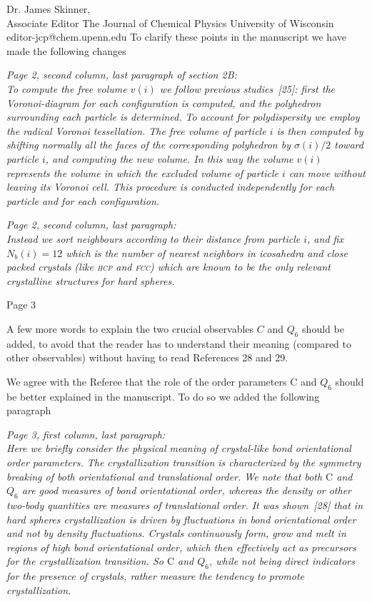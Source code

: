 \documentclass[a4paper, rebuttal, parskip=true, firsthead=false, fromemail=false, foldmarks=false]{scrlttr2}
\begin{document}
\begin{letter}{Dr. James Skinner,\\Associate Editor
The Journal of Chemical Physics
University of Wisconsin\\
editor-jcp@chem.upenn.edu }
To clarify these points in the manuscript we have made the following changes

{\it Page 2, second column, last paragraph of section 2B:\\
To compute the free volume $v(i)$ we follow previous
studies~[25]: first the Voronoi-diagram for each configuration is computed, and the polyhedron
surrounding each particle is determined. To account for polydispersity we employ the radical Voronoi tessellation.
The free volume of particle $i$ is then
computed by shifting normally all the faces of the corresponding polyhedron by $\sigma(i)/2$
toward particle $i$, and computing the new volume. In this way
the volume $v(i)$ represents the volume in which the excluded volume of particle $i$ can move without leaving its Voronoi cell.
This procedure is conducted independently
for each particle and for each configuration.
}

{\it Page 2, second column, last paragraph:\\
Instead we
sort neighbours according to their distance from particle $i$, and
fix $N_b(i)=12$ which is the number of nearest neighbors in icosahedra and close packed crystals (like \textsc{hcp} and \textsc{fcc})
which are known to be the only relevant crystalline structures for hard spheres.
}


\begin{quotationi}
Page 3

A few more words to explain the two crucial observables $C$ and $Q_6$ should be added, to avoid that the reader has to understand their meaning (compared to other observables) without having to read References 28 and 29.
\end{quotationi}

We agree with the Referee that the role of the order parameters $\text{C}$ and $Q_6$ should be better explained in the manuscript. To do so we added the following
paragraph

{\it Page 3, first column, last paragraph:\\
Here we briefly consider the physical meaning of crystal-like bond orientational order parameters.  
The crystallization transition is characterized by
the symmetry breaking of both orientational and translational order.
We note that both $\text{C}$ and $Q_6$ are good measures of bond orientational order, whereas the density or other two-body
quantities are measures of translational order.  It was shown~[28] that in hard spheres crystallization is
driven by fluctuations in bond orientational order and not by density fluctuations. Crystals continuously form, grow and melt
in regions of high bond orientational order, which then effectively act as precursors for the crystallization transition.
So $\text{C}$ and $Q_6$, while not
being direct indicators for the presence of crystals, rather measure the tendency to promote crystallization. 
}


\end{letter}
\end{document}
